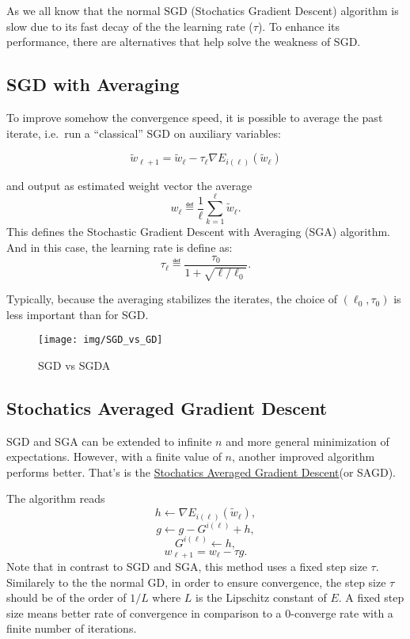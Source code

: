 \documentclass[
  a4paper]{article}
\begin{document}
As we all know that the normal SGD (Stochatics Gradient Descent) algorithm is slow due to its fast decay of the the learning rate (\(\tau\)). To enhance its performance, there are alternatives that help solve the weakness of SGD.

\hypertarget{sgd-with-averaging}{%
\subsection{SGD with Averaging}\label{sgd-with-averaging}}

To improve somehow the convergence speed, it is possible to average the past
iterate, i.e.~run a ``classical'' SGD on auxiliary variables:

\[ \tilde w_{\ell+1} = \tilde w_\ell - \tau_\ell \nabla E_{i(\ell)}(\tilde w_\ell) \]

and output as estimated weight vector the average
\[ w_\ell \eqdef \frac{1}{\ell} \sum_{k=1}^\ell \tilde w_\ell. \]
This defines the Stochastic Gradient Descent with Averaging (SGA)
algorithm. And in this case, the learning rate is define as: \[ \tau_\ell \eqdef \frac{\tau_0}{1 + \sqrt{\ell/\ell_0}}. \]

Typically, because the averaging stabilizes the iterates, the choice of
\((\ell_0,\tau_0)\) is less important than for SGD.

\begin{figure}

{\centering \texttt{[image: img/SGD\_vs\_GD]} 

}

\caption{SGD vs SGDA}\label{fig:unnamed-chunk-4}
\end{figure}

\hypertarget{stochatics-averaged-gradient-descent}{%
\subsection{Stochatics Averaged Gradient Descent}\label{stochatics-averaged-gradient-descent}}

SGD and SGA can be extended to infinite \(n\) and more general minimization of
expectations. However, with a finite value of \(n\), another improved algorithm performs better. That's is the \href{https://arxiv.org/pdf/1309.2388.pdf}{Stochatics Averaged Gradient Descent}(or SAGD).

The algorithm reads
\[ h \leftarrow \nabla E_{i(\ell)}(\tilde w_\ell), \]
\[ g  \leftarrow g - G^{i(\ell)} + h,   \]
\[ G^{i(\ell)} \leftarrow h,  \]
\[ w_{\ell+1} = w_\ell - \tau g.  \]
Note that in contrast to SGD and SGA, this method uses a fixed step size \(\tau\). Similarely to the the normal GD, in order to ensure convergence, the step size \(\tau\) should be of the order of \(1/L\) where \(L\) is the Lipschitz constant of \(E\). A fixed step size means better rate of convergence in comparison to a 0-converge rate with a finite number of iterations.
\end{document}
